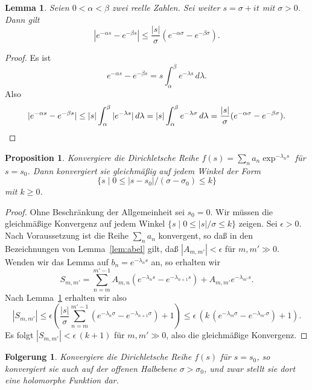 \documentclass[a4paper,twoside,openright]{report}
\newtheorem{prop}[thm]{Proposition}
\newtheorem{lem}[thm]{Lemma}
\newtheorem{cor}[thm]{Folgerung}
\theoremstyle{definition}
\theoremstyle{remark}
\begin{document}
\begin{lem}
  \label{lem:dirichlet1}
  Seien $0 < \alpha < \beta$ zwei reelle Zahlen. Sei weiter $s = \sigma + i t$ mit
  $\sigma > 0$. Dann gilt
  \[
    |e^{-\alpha s} - e^{-\beta s}| \leq \frac{|s|}\sigma (e^{-\alpha \sigma}  - e^{-\beta \sigma}).
  \]
\end{lem}

\begin{proof}
  Es ist
  \[
    e^{-\alpha s} - e^{-\beta s} = s \int_{\alpha}^\beta e^{-\lambda s} \, d\lambda.
  \]
  Also
  \[
    |e^{-\alpha s} - e^{-\beta s}| \leq |s| \int_{\alpha}^\beta |e^{-\lambda s}| \, d\lambda
    = |s| \int_\alpha^\beta e^{-\lambda \sigma} \, d\lambda
    = \frac{|s|} \sigma (e^{-\alpha \sigma} - e^{-\beta \sigma}).
    \qedhere
  \]
\end{proof}

\begin{prop}
  Konvergiere die Dirichletsche Reihe $f(s) = \sum_n a_n \exp^{- \lambda_n s}$ für $s = s_0$. Dann 
  konvergiert sie gleichmäßig auf jedem Winkel der Form
  \[
    \{s \mid 0 \leq |s - s_0|/(\sigma - \sigma_0) \leq k\}
  \]
  mit $k \ge 0$.
\end{prop}

\begin{proof}
  Ohne Beschränkung der Allgemeinheit sei $s_0 = 0$. 
  Wir müssen die gleichmäßige Konvergenz auf jedem Winkel $\{s \mid 0 \leq |s|/\sigma \leq k\}$ zeigen. 
  Sei $\epsilon > 0$.
  Nach Voraussetzung ist die Reihe $\sum_n a_n$ konvergent, so daß in den
  Bezeichnungen von Lemma~\ref{lem:abel} gilt, daß $|A_{m, m'}| < \epsilon$
  für $m, m' \gg 0$. Wenden wir das Lemma auf $b_n = e^{-\lambda_n s}$ an,
  so erhalten wir
  \[
    S_{m, m'} = \sum_{n = m}^{m' - 1} A_{m, n} (e^{- \lambda_n s} - e^{-\lambda_{n + 1} s}) + A_{m, m'} e^{-\lambda_{m'} s}. 
  \]
  Nach Lemma~\ref{lem:dirichlet1} erhalten wir also
  \[
    |S_{m, m'}| \leq \epsilon \left(
      \frac{|s|}{\sigma} \sum_{n = m}^{m' - 1} (e^{-\lambda_n \sigma} - e^{-\lambda_{n + 1} \sigma}) + 1\right)
    \leq \epsilon \, (k \, (e^{-\lambda_m \sigma} - e^{-\lambda_{m'} \sigma}) + 1).
  \]
  Es folgt $|S_{m, m'}| < \epsilon \, (k + 1)$ für $m, m' \gg 0$, also
  die gleichmäßige Konvergenz.
\end{proof}

\begin{cor}
  Konvergiere die Dirichletsche Reihe $f(s)$ für $s = s_0$, so konvergiert sie
  auch auf der offenen Halbebene $\sigma > \sigma_0$, und zwar stellt sie dort
  eine holomorphe Funktion dar.
\end{cor}
\end{document}
